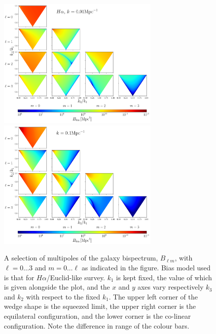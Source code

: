 {\clearpage
\begin{figure}[ht]
\centering
    \includegraphics[width=0.7\textwidth]{fig/triangles_all_k001_Euclid.png}
	\includegraphics[width=0.7\textwidth]{fig/triangles_all_k01_Euclid.png}
	\caption{A selection of multipoles of the galaxy bispectrum, \(B_{\ell m}\), with \(\ell = 0 \ldots 3\) and \(m = 0 \ldots \ell\) as indicated in the figure. Bias model used is that for \(H\alpha\)/Euclid-like survey. \(k_1\) is kept fixed, the value of which is given alongside the plot, and the \(x\) and \(y\) axes vary respectively \(k_3\) and \(k_2\) with respect to the fixed \(k_1\). The upper left corner of the wedge shape is the squeezed limit, the upper right corner is the equilateral configuration, and the lower corner is the co-linear configuration. Note the difference in range of the colour bars.}
		\label{fig:euclidtriangle}
\end{figure}

}
